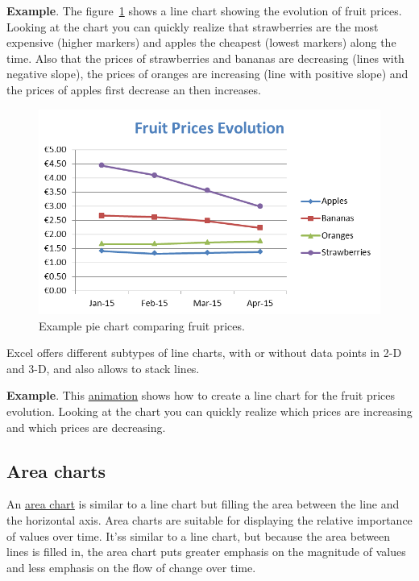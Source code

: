 \textbf{Example}. The figure~\ref{img-example_chart_line} shows a line chart showing the evolution of fruit prices. Looking at the
chart you can quickly realize that strawberries are the most expensive (higher markers) and apples the cheapest (lowest markers) along the time. Also that the prices of strawberries and bananas are decreasing (lines with negative slope), the prices of oranges are increasing (line with positive slope) and the prices of apples first decrease an then increases.

\begin{figure}[htbp]
\begin{center}
\includegraphics[scale=0.7]{../img/example_chart_line.png}
\end{center}
\caption{Example pie chart comparing fruit prices.}
\label{img-example_chart_line}
\end{figure}

Excel offers different subtypes of line charts, with or without data points in 2-D and 3-D, and also allows to stack lines.

\textbf{Example}. This \href{http://aprendeconalf.es/office/excel/manual/img/example_chart_line.gif}{animation} shows how to create a line chart for the fruit prices evolution. Looking at the chart you can quickly realize which prices are increasing and which prices are decreasing.

\subsection{Area charts}\hypertarget{area-charts}{}\label{area-charts}

An \href{https://en.wikipedia.org/wiki/Area\_chart}{area chart} is similar to a line chart but filling the area between the line and the horizontal axis. 
Area charts are suitable for displaying the relative importance of values over time. It'ss similar to a line chart, but because the area between lines is filled in, the area chart puts greater emphasis on the magnitude of values and less emphasis on the flow of change over time.

